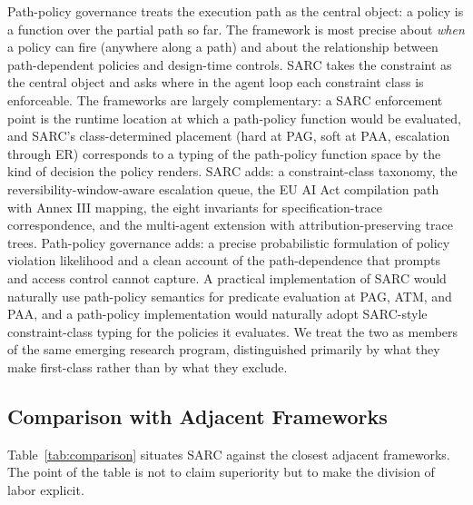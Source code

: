 \documentclass[11pt,a4paper]{article}
\theoremstyle{remark}
\begin{document}
Path-policy governance treats the execution path as the central object: a policy is a function over the partial path so far. The framework is most precise about \emph{when} a policy can fire (anywhere along a path) and about the relationship between path-dependent policies and design-time controls. SARC takes the constraint as the central object and asks where in the agent loop each constraint class is enforceable. The frameworks are largely complementary: a SARC enforcement point is the runtime location at which a path-policy function would be evaluated, and SARC's class-determined placement (hard at PAG, soft at PAA, escalation through ER) corresponds to a typing of the path-policy function space by the kind of decision the policy renders. SARC adds: a constraint-class taxonomy, the reversibility-window-aware escalation queue, the EU AI Act compilation path with Annex III mapping, the eight invariants for specification-trace correspondence, and the multi-agent extension with attribution-preserving trace trees. Path-policy governance adds: a precise probabilistic formulation of policy violation likelihood and a clean account of the path-dependence that prompts and access control cannot capture. A practical implementation of SARC would naturally use path-policy semantics for predicate evaluation at PAG, ATM, and PAA, and a path-policy implementation would naturally adopt SARC-style constraint-class typing for the policies it evaluates. We treat the two as members of the same emerging research program, distinguished primarily by what they make first-class rather than by what they exclude.

\subsection{Comparison with Adjacent Frameworks}\label{sec:comparison}

Table~\ref{tab:comparison} situates SARC against the closest adjacent frameworks. The point of the table is not to claim superiority but to make the division of labor explicit.
\end{document}

